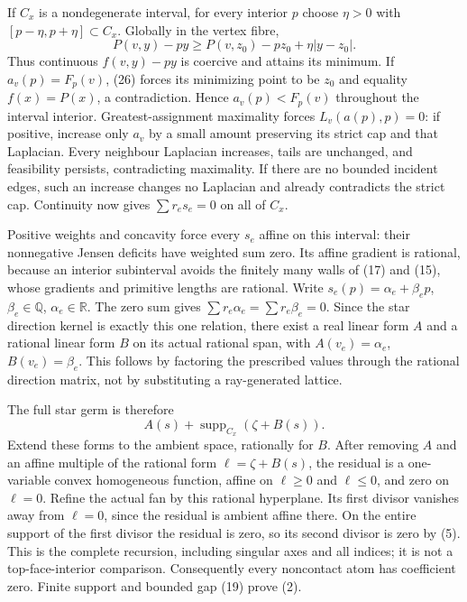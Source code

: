 \documentclass[
  11pt,
]{article}
\begin{document}
If \(C_x\) is a nondegenerate interval, for every interior \(p\) choose
\(\eta>0\) with \([p-\eta,p+\eta]\subset C_x\). Globally in the vertex
fibre, \[
 P(v,y)-py\geq P(v,z_0)-pz_0+\eta|y-z_0|.                 \tag{26}
\] Thus continuous \(f(v,y)-py\) is coercive and attains its minimum. If
\(a_v(p)=F_p(v)\), (26) forces its minimizing point to be \(z_0\) and
equality \(f(x)=P(x)\), a contradiction. Hence \(a_v(p)<F_p(v)\)
throughout the interval interior. Greatest-assignment maximality forces
\(L_v(a(p),p)=0\): if positive, increase only \(a_v\) by a small amount
preserving its strict cap and that Laplacian. Every neighbour Laplacian
increases, tails are unchanged, and feasibility persists, contradicting
maximality. If there are no bounded incident edges, such an increase
changes no Laplacian and already contradicts the strict cap. Continuity
now gives \(\sum r_es_e=0\) on all of \(C_x\).

Positive weights and concavity force every \(s_e\) affine on this
interval: their nonnegative Jensen deficits have weighted sum zero. Its
affine gradient is rational, because an interior subinterval avoids the
finitely many walls of (17) and (15), whose gradients and primitive
lengths are rational. Write \(s_e(p)=\alpha_e+\beta_ep\),
\(\beta_e\in\mathbb{Q}\), \(\alpha_e\in\mathbb{R}\). The zero sum gives
\(\sum r_e\alpha_e=\sum r_e\beta_e=0\). Since the star direction kernel
is exactly this one relation, there exist a real linear form \(A\) and a
rational linear form \(B\) on its actual rational span, with
\(A(v_e)=\alpha_e\), \(B(v_e)=\beta_e\). This follows by factoring the
prescribed values through the rational direction matrix, not by
substituting a ray-generated lattice.

The full star germ is therefore \[
                              A(s)+\operatorname{supp}_{C_x}(\zeta+B(s)).\tag{27}
\] Extend these forms to the ambient space, rationally for \(B\). After
removing \(A\) and an affine multiple of the rational form
\(\ell=\zeta+B(s)\), the residual is a one-variable convex homogeneous
function, affine on \(\ell\geq0\) and \(\ell\leq0\), and zero on
\(\ell=0\). Refine the actual fan by this rational hyperplane. Its first
divisor vanishes away from \(\ell=0\), since the residual is ambient
affine there. On the entire support of the first divisor the residual is
zero, so its second divisor is zero by (5). This is the complete
recursion, including singular axes and all indices; it is not a
top-face-interior comparison. Consequently every noncontact atom has
coefficient zero. Finite support and bounded gap (19) prove (2).
\end{document}
